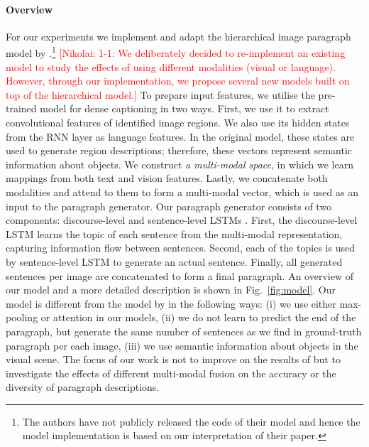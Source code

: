 \documentclass[11pt,a4paper]{article}
\newcommand{\kibitz}[2]{\ifnum\Comments=1\textcolor{#1}{#2}\fi}
\newcommand{\nikolai}[1]{\kibitz{red}  {[Nikolai: #1]}}
\begin{document}
\paragraph{Overview}
For our experiments we implement and adapt the hierarchical image paragraph model by \citet{krause2016hierarchical}.\footnote{The authors have not publicly released the code of their model and hence the model implementation is based on our interpretation of their paper.}
\nikolai{1-1: We deliberately decided to re-implement an existing model to study the effects of using different modalities (visual or language).
However, through our implementation, we propose several new models built on top of the hierarchical model.}
To prepare input features, we utilise the pre-trained model for dense captioning \cite{densecap} in two ways.
First, we use it to extract convolutional features of identified image regions.
We also use its hidden states from the RNN layer as language features.
In the original model, these states are used to generate region descriptions; therefore, these vectors represent semantic information about objects.
We construct \textit{a multi-modal space}, in which we learn mappings from both text and vision features.
Lastly, we concatenate both modalities and attend to them to form a multi-modal vector, which is used as an input to the paragraph generator.
Our paragraph generator consists of two components: discourse-level and sentence-level LSTMs \cite{lstm97}.
First, the discourse-level LSTM learns the topic of each sentence from the multi-modal representation, capturing information flow between sentences.
Second, each of the topics is used by sentence-level LSTM to generate an actual sentence.
Finally, all generated sentences per image are concatenated to form a final paragraph.
An overview of our model and a more detailed description is shown in Fig.~\ref{fig:model}.
Our model is different from the model by  in the following ways: (i) we use either max-pooling or attention in our models, (ii) we do not learn to predict the end of the paragraph, but generate the same number of sentences as we find in ground-truth paragraph per each image, (iii) we use semantic information about objects in the visual scene.
The focus of our work is not to improve on the results of  but to investigate the effects of different multi-modal fusion on the accuracy or the diversity of paragraph descriptions. %
\end{document}
